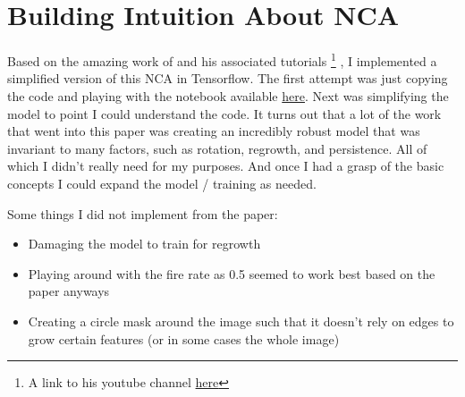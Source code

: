 

\chapter{Building Intuition About NCA} %

\label{AppendixB} %

Based on the amazing work of \citeauthor{growing_nca} and his associated tutorials \footnote{A link to his youtube channel \href{https://www.youtube.com/@zzznah}{here}} , I implemented a simplified version of this NCA in Tensorflow. The first attempt was just copying the code and playing with the notebook available \href{https://colab.research.google.com/github/google-research/self-organising-systems/blob/master/notebooks/growing_ca.ipynb}{here}. Next was simplifying the model to point I could understand the code. It turns out that a lot of the work that went into this paper was creating an incredibly robust model that was invariant to many factors, such as rotation, regrowth, and persistence. All of which I didn't really need for my purposes. And once I had a grasp of the basic concepts I could expand the model / training as needed.

Some things I did not implement from the paper:
\begin{itemize}
	\item Damaging the model to train for regrowth
	\item Playing around with the fire rate as 0.5 seemed to work best based on the paper anyways
	\item Creating a circle mask around the image such that it doesn't rely on edges to grow certain features (or in some cases the whole image)
\end{itemize}

